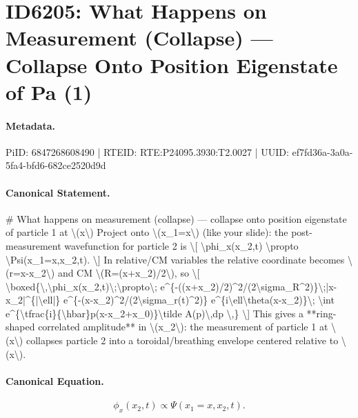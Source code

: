 \section*{ID6205: What Happens on Measurement (Collapse) — Collapse Onto Position Eigenstate of Pa (1)}
\paragraph{Metadata.}
PiID: 6847268608490 | RTEID: RTE:P24095.3930:T2.0027 | UUID: ef7fd36a-3a0a-5fa4-bfd6-682ce2520d9d

\paragraph{Canonical Statement.}
\# What happens on measurement (collapse) — collapse onto position eigenstate of particle 1 at \textbackslash{}(x\textbackslash{}) Project onto \textbackslash{}(x\_1=x\textbackslash{}) (like your slide): the post-measurement wavefunction for particle 2 is \textbackslash{}[ \textbackslash{}phi\_x(x\_2,t) \textbackslash{}propto \textbackslash{}Psi(x\_1=x,x\_2,t). \textbackslash{}] In relative/CM variables the relative coordinate becomes \textbackslash{}(r=x-x\_2\textbackslash{}) and CM \textbackslash{}(R=(x+x\_2)/2\textbackslash{}), so \textbackslash{}[ \textbackslash{}boxed\{\textbackslash{},\textbackslash{}phi\_x(x\_2,t)\textbackslash{};\textbackslash{}propto\textbackslash{}; e\textasciicircum{}\{-((x+x\_2)/2)\textasciicircum{}2/(2\textbackslash{}sigma\_R\textasciicircum{}2)\}\textbackslash{};|x-x\_2|\textasciicircum{}\{|\textbackslash{}ell|\} e\textasciicircum{}\{-(x-x\_2)\textasciicircum{}2/(2\textbackslash{}sigma\_r(t)\textasciicircum{}2)\} e\textasciicircum{}\{i\textbackslash{}ell\textbackslash{}theta(x-x\_2)\}\textbackslash{}; \textbackslash{}int e\textasciicircum{}\{\textbackslash{}tfrac\{i\}\{\textbackslash{}hbar\}p(x-x\_2+x\_0)\}\textbackslash{}tilde A(p)\textbackslash{},dp \textbackslash{},\} \textbackslash{}] This gives a **ring-shaped correlated amplitude** in \textbackslash{}(x\_2\textbackslash{}): the measurement of particle 1 at \textbackslash{}(x\textbackslash{}) collapses particle 2 into a toroidal/breathing envelope centered relative to \textbackslash{}(x\textbackslash{}).

\paragraph{Canonical Equation.}
\[
\phi_x(x_2,t) \propto \Psi(x_1=x,x_2,t).
\]

